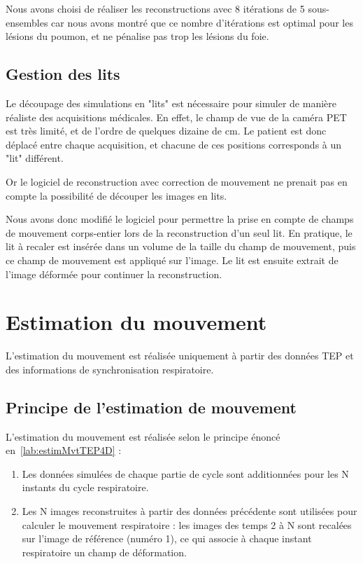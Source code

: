 Nous avons choisi de réaliser les reconstructions avec 8 itérations de 5 sous-ensembles car nous avons montré que ce nombre d'itérations est optimal pour les lésions du poumon, et ne pénalise pas trop les lésions du foie.

\subsection{Gestion des lits}

Le découpage des simulations en "lits" est nécessaire pour simuler de manière réaliste des acquisitions médicales. En effet, le champ de vue de la caméra PET est très limité, et de l'ordre de quelques dizaine de cm. Le patient est donc déplacé entre chaque acquisition, et chacune de ces positions corresponds à un "lit" différent.

Or le logiciel de reconstruction avec correction de mouvement ne prenait pas en compte la possibilité de découper les images en lits.

Nous avons donc modifié le logiciel pour permettre la prise en compte de champs de mouvement corps-entier lors de la reconstruction d'un seul lit. En pratique, le lit à recaler est insérée dans un volume de la taille du champ de mouvement, puis ce champ de mouvement est appliqué sur l'image. Le lit est ensuite extrait de l'image déformée pour continuer la reconstruction.


\section{Estimation du mouvement}

L'estimation du mouvement est réalisée uniquement à partir des données TEP et des informations de synchronisation respiratoire. 

\subsection{Principe de l'estimation de mouvement}

L'estimation du mouvement est réalisée selon le principe énoncé en~\ref{lab:estimMvtTEP4D} :
\begin{enumerate}
 \item Les données simulées de chaque partie de cycle sont additionnées pour les N instants du cycle respiratoire.
 \item Les N images reconstruites à partir des données précédente sont utilisées pour calculer le mouvement respiratoire : les images des temps 2 à N sont recalées sur l'image de référence (numéro 1), ce qui associe à chaque instant respiratoire un champ de déformation.
\end{enumerate}


